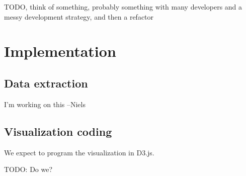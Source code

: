 \documentclass[a4paper,12pt]{article}
\begin{document}
TODO, think of something, probably something with many developers and a messy
development strategy, and then a refactor


\section{Implementation}

\subsection{Data extraction}

I'm working on this --Niels

\subsection{Visualization coding}

We expect to program the visualization in D3.js.

TODO: Do we?
\end{document}
